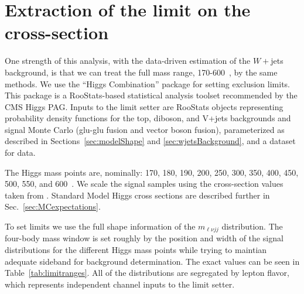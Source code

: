 \section{Extraction of the limit on the cross-section}
\label{sec:limitExtraction}

One strength of this analysis, with the data-driven estimation of the
$W+$jets background, is that we can treat the full mass range,
170-600~\GeV, by the same methods.  We use the ``Higgs Combination''
package \cite{cite:combine} for setting exclusion limits. This package
is a RooStats\cite{cite:roostats}-based statistical analysis toolset
recommended by the CMS Higgs PAG.  Inputs to the limit setter are
RooStats objects representing probability density functions for the
top, diboson, and V+jets backgrounds and signal Monte Carlo (glu-glu
fusion and vector boson fusion), parameterized as described in
Sections~\ref{sec:modelShape} and \ref{sec:wjetsBackground}, and a
dataset for data.

The Higgs mass points are, nominally: 170, 180, 190, 200, 250, 300,
350, 400, 450, 500, 550, and 600~\GeV.  We scale the
signal samples using the cross-section values taken from
\cite{cite:higgsxsecbr}.  Standard Model Higgs cross
sections are described further in Sec.~\ref{sec:MCexpectations}.

To set limits we use the full shape information of the $m_{\ell\nu
  jj}$ distribution.  The four-body mass window is set roughly by the
position and width of the signal distributions for the different Higgs
mass points while trying to maintian adequate sideband for background
determination. The exact values can be seen in
Table~\ref{tab:limitranges}.  All of the distributions are segregated
by lepton flavor, which represents independent channel inputs to the
limit setter.

